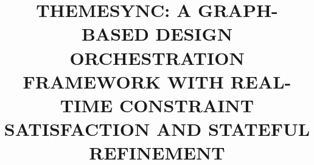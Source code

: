 \documentclass[12pt]{cspcccsthesis}
\title{
THEMESYNC: A GRAPH-BASED DESIGN ORCHESTRATION FRAMEWORK WITH REAL-TIME CONSTRAINT SATISFACTION AND STATEFUL REFINEMENT 
}
\begin{document}

\begin{frontmatter}
\end{frontmatter}

\begin{thesisbody}
    
    
    
    
\end{thesisbody}
\end{document}
